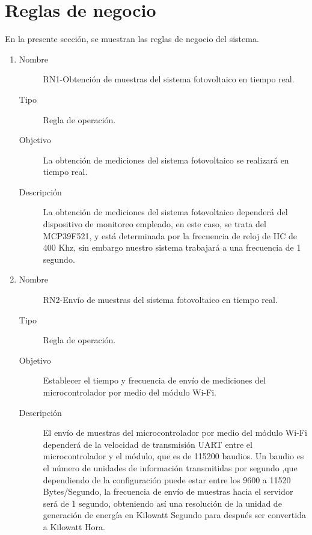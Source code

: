 \section{Reglas de negocio}
En la presente sección, se muestran las reglas de negocio del sistema.
\begin{enumerate}[label=RN\arabic*.]
    \item \label{RN1}
		\begin{description}
			\item[Nombre] RN1-Obtención de muestras del sistema fotovoltaico en tiempo real.
			\item[Tipo] Regla de operación.
			\item[Objetivo] La obtención de mediciones del sistema fotovoltaico se realizará en tiempo real.
			\item[Descripción] La obtención de mediciones del sistema fotovoltaico dependerá del dispositivo de monitoreo empleado, en este caso, se trata del MCP39F521, y está determinada por la frecuencia de reloj de IIC de 400 Khz, sin embargo nuestro sistema trabajará a una frecuencia de 1 segundo.
    		\end{description}
    		
\item \label{RN2}
	\begin{description}
		\item[Nombre] RN2-Envío de muestras del sistema fotovoltaico en tiempo real.
		\item[Tipo] Regla de operación.
		\item[Objetivo] Establecer el tiempo y frecuencia de envío de mediciones del microcontrolador por medio del módulo Wi-Fi.
		\item[Descripción] El envío de muestras del microcontrolador por medio del módulo Wi-Fi dependerá de la velocidad de transmisión UART entre el microcontrolador y el módulo, que es de 115200 baudios. Un baudio es el número de unidades de información transmitidas por segundo ,que dependiendo de la configuración puede estar entre los 9600 a 11520 Bytes/Segundo, la frecuencia de envío de muestras hacia el servidor será de 1 segundo, obteniendo así una resolución de la unidad de generación de energía en Kilowatt Segundo para después ser convertida a Kilowatt Hora.
		\end{description}	
		

\end{enumerate}
